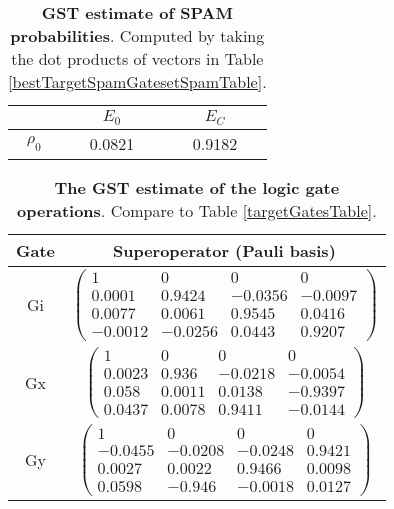 {\begin{table}[h]
\begin{center}
\begin{tabular}[l]{|c|c|c|}
\hline
 & $E_{0}$ & $E_C$ \\ \hline
$\rho_{0}$ & 0.0821 & 0.9182 \\ \hline
\end{tabular}

\caption{\textbf{GST estimate of SPAM probabilities}.  Computed by taking the dot products of vectors in Table \ref{bestTargetSpamGatesetSpamTable}.\label{bestTargetSpamGatesetSpamParametersTable}}
\end{center}
\end{table}

\begin{table}[h]
\begin{center}
\begin{tabular}[l]{|c|c|}
\hline
Gate & Superoperator (Pauli basis) \\ \hline
Gi & $ \left(\!\!\begin{array}{cccc}
1 & 0 & 0 & 0 \\ 
0.0001 & 0.9424 & -0.0356 & -0.0097 \\ 
0.0077 & 0.0061 & 0.9545 & 0.0416 \\ 
-0.0012 & -0.0256 & 0.0443 & 0.9207
 \end{array}\!\!\right) $
 \\ \hline
Gx & $ \left(\!\!\begin{array}{cccc}
1 & 0 & 0 & 0 \\ 
0.0023 & 0.936 & -0.0218 & -0.0054 \\ 
0.058 & 0.0011 & 0.0138 & -0.9397 \\ 
0.0437 & 0.0078 & 0.9411 & -0.0144
 \end{array}\!\!\right) $
 \\ \hline
Gy & $ \left(\!\!\begin{array}{cccc}
1 & 0 & 0 & 0 \\ 
-0.0455 & -0.0208 & -0.0248 & 0.9421 \\ 
0.0027 & 0.0022 & 0.9466 & 0.0098 \\ 
0.0598 & -0.946 & -0.0018 & 0.0127
 \end{array}\!\!\right) $
 \\ \hline
\end{tabular}

\caption{\textbf{The GST estimate of the logic gate operations}.  Compare to Table \ref{targetGatesTable}.\label{bestTargetSpamGatesetGatesTable}}
\end{center}
\end{table}

}
